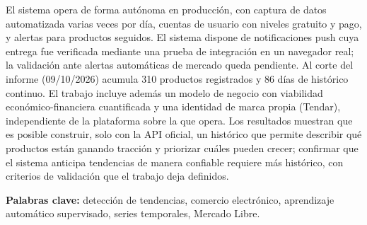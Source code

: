 El sistema opera de forma autónoma en producción, con captura de datos automatizada varias veces por día, cuentas de usuario con niveles gratuito y pago, y alertas para productos seguidos. El sistema dispone de notificaciones push cuya entrega fue verificada mediante una prueba de integración en un navegador real; la validación ante alertas automáticas de mercado queda pendiente. Al corte del informe (09/10/2026) acumula 310 productos registrados y 86 días de histórico continuo. El trabajo incluye además un modelo de negocio con viabilidad económico-financiera cuantificada y una identidad de marca propia (Tendar), independiente de la plataforma sobre la que opera. Los resultados muestran que es posible construir, solo con la API oficial, un histórico que permite describir qué productos están ganando tracción y priorizar cuáles pueden crecer; confirmar que el sistema anticipa tendencias de manera confiable requiere más histórico, con criterios de validación que el trabajo deja definidos.

\vspace{0.5cm}
\noindent\textbf{Palabras clave:} detección de tendencias, comercio electrónico, aprendizaje automático supervisado, series temporales, Mercado Libre.